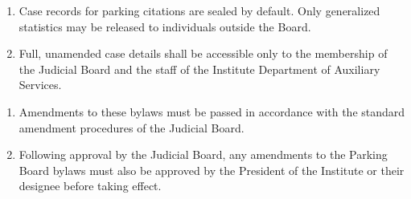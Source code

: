 \begin{enumerate}
    \item Case records for parking citations are sealed by default. Only generalized statistics may be released to individuals outside the Board.
    \item Full, unamended case details shall be accessible only to the membership of the Judicial Board and the staff of the Institute Department of Auxiliary Services.
\end{enumerate}

\begin{enumerate}
    \item Amendments to these bylaws must be passed in accordance with the standard amendment procedures of the Judicial Board.
    \item Following approval by the Judicial Board, any amendments to the Parking Board bylaws must also be approved by the President of the Institute or their designee before taking effect.
\end{enumerate}
